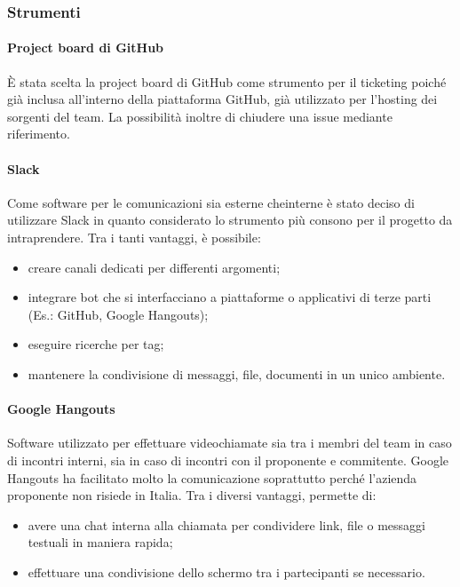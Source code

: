	\subsubsection{Strumenti}
   	\paragraph{Project board di GitHub}
	È stata scelta la project board di GitHub come strumento per il ticketing poiché già inclusa all'interno della piattaforma GitHub, già utilizzato per l'hosting dei sorgenti del team. La possibilità inoltre di chiudere una issue mediante riferimento.
	
	\paragraph{Slack}
	Come software per le comunicazioni sia esterne cheinterne è stato deciso di utilizzare Slack in quanto considerato lo strumento più consono per il progetto da intraprendere.
	Tra i tanti vantaggi, è possibile:
	\begin{itemize}
		\item creare canali dedicati per differenti argomenti;
		\item integrare bot che si interfacciano a piattaforme o applicativi di terze parti (Es.: GitHub, Google Hangouts);
		\item eseguire ricerche per tag;
		\item mantenere la condivisione di messaggi, file, documenti in un unico ambiente.
	\end{itemize}
	
	\paragraph{Google Hangouts}
	Software utilizzato per effettuare videochiamate sia tra i membri del team in caso di incontri interni, sia in caso di incontri con il proponente e commitente. Google Hangouts ha facilitato molto la comunicazione soprattutto perché l'azienda proponente non risiede in Italia.
	Tra i diversi vantaggi, permette di:
	\begin{itemize}
		\item avere una chat interna alla chiamata per condividere link, file o messaggi testuali in maniera rapida;
		\item effettuare una condivisione dello schermo tra i partecipanti se necessario.
	\end{itemize}


